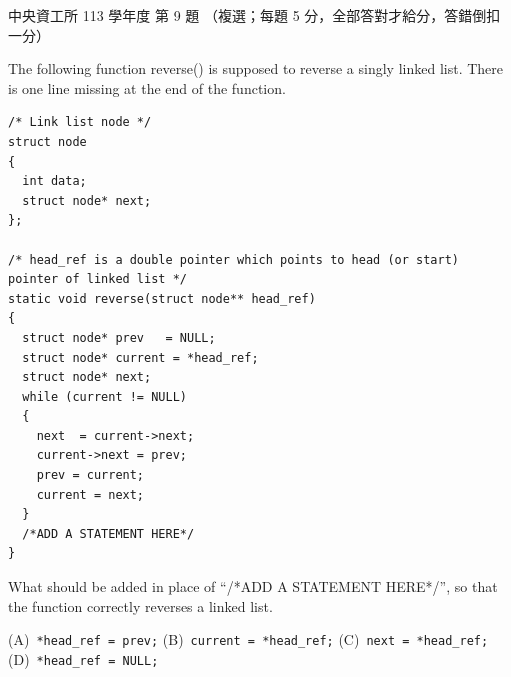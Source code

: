 \begin{pastexam}[label={px:ncu-113-dsa-09}]{中央資工所 113 學年度 第 9 題}
（複選；每題 5 分，全部答對才給分，答錯倒扣一分）

The following function reverse() is supposed to reverse a singly linked list. There is one line missing at
the end of the function.
\begin{verbatim}
/* Link list node */
struct node
{
  int data;
  struct node* next;
};

/* head_ref is a double pointer which points to head (or start) pointer of linked list */
static void reverse(struct node** head_ref)
{
  struct node* prev   = NULL;
  struct node* current = *head_ref;
  struct node* next;
  while (current != NULL)
  {
    next  = current->next;
    current->next = prev;
    prev = current;
    current = next;
  }
  /*ADD A STATEMENT HERE*/
}
\end{verbatim}
What should be added in place of ``/*ADD A STATEMENT HERE*/'', so that the function correctly reverses a
linked list.

(A)~\texttt{*head\_ref = prev;} \qquad (B)~\texttt{current = *head\_ref;} \qquad
(C)~\texttt{next = *head\_ref;} \qquad (D)~\texttt{*head\_ref = NULL;}
\end{pastexam}

